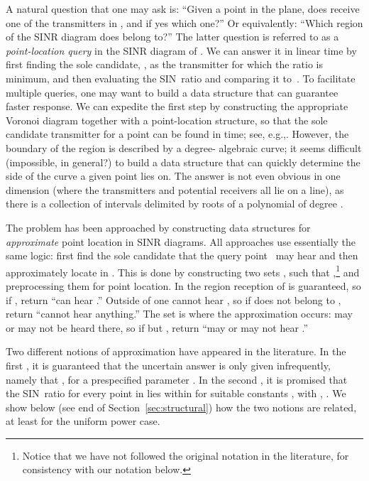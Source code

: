 \documentclass[11pt]{article}
\theoremstyle{remark}
\begin{document}
A natural question that one may ask is: ``Given a point  in the plane, does  receive one of the transmitters in , and if yes which one?'' 
Or equivalently: ``Which region of the SINR diagram does  belong to?'' The latter question is referred to as a \emph{point-location query} in the SINR diagram of . 
We can answer it in linear time by first finding the sole candidate, , as the transmitter for which the ratio  is minimum, and then evaluating the SIN~ratio and comparing it to~.  To facilitate multiple queries, one may want to build a data structure that can guarantee faster response.
We can expedite the first step by constructing the appropriate Voronoi diagram  
together with a point-location structure, so that the sole candidate transmitter for a point  can be found in  time; see, e.g.,\cite{AKL-VD}.
However, the boundary of the region  is described by a degree- algebraic curve; it seems difficult (impossible, in general?) to build a data structure that can quickly determine the side of the curve a given point lies on.  The answer is not even obvious in one dimension (where the transmitters and potential receivers all lie on a line), as there  is a collection of intervals delimited by roots of a polynomial of degree . 

The problem has been approached by constructing data structures for \emph{approximate} point location in SINR diagrams.  All approaches use essentially the same logic: first find the sole candidate  that the query point~ may hear and then approximately locate  in .  This is done by constructing two sets ,  such that ,\footnote{Notice that we have not followed the original notation in the literature, for consistency with our notation below.}
and preprocessing them for point location.
In the region  reception of  is guaranteed, so if , return ``can hear .''  Outside of  one cannot hear , so if  does not belong to , return ``cannot hear anything.''  The set  is where the approximation occurs:  may or may not be heard there, so if  but , return ``may or may not hear .''


Two different notions of approximation have appeared in the literature. In the first \cite{aeklpr-sdciawn-12,klpp-twn-11}, it is guaranteed that the uncertain answer is only given infrequently, namely that , for a prespecified parameter .  In the second \cite{klpp-twn-11}, it is promised that the SIN~ratio for every point in  lies within  for suitable constants ,  with , .
We show below (see end of Section~\ref{sec:structural}) how the two notions are related, at least for the uniform power case.
\end{document}
